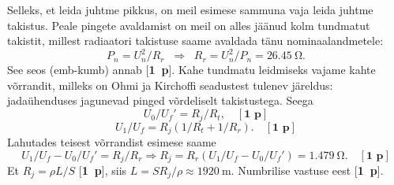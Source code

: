 \documentclass[11pt,a5paper]{article}
\newcommand{\p}[1]{[\textbf{#1~p}]}
\begin{document}
Selleks, et leida juhtme pikkus, on meil esimese sammuna vaja leida juhtme takistus. Peale pingete avaldamist on meil on alles jäänud kolm tundmatut takistit, millest radiaatori takistuse saame avaldada tänu nominaalandmetele: 
$$P_n=U_n^2/R_r\;\; \Rightarrow\;\; R_r=U_n^2/P_n=\SI{26.45}{\ohm}.$$
See seos (emb-kumb) annab \p{1}. Kahe tundmatu leidmiseks vajame kahte võrrandit, milleks on Ohmi ja Kirchoffi seadustest tulenev järeldus: jadaühenduses jagunevad pinged võrdeliselt takistustega. Seega
$$U_0/U_f'=R_j/R_t,\quad\p{1}$$
$$U_1/U_f=R_j(1/R_t+1/R_r).\quad\p{1}$$
Lahutades teisest võrrandist esimese saame
$$U_1/U_f-U_0/U_f'=R_j/R_r\Rightarrow R_j=R_r(U_1/U_f-U_0/U_f')=\SI{1.479}{\ohm}.\quad\p{1}$$
Et $R_j=\rho L/S$ \p{1}, siis $L=SR_j/\rho\approx\SI{1920}{\m}$. Numbrilise vastuse eest \p{1}.
\end{document}
